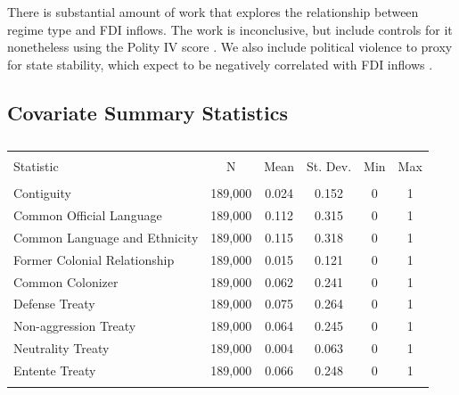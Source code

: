 \documentclass{article}
\begin{document}
There is substantial amount of work that explores the relationship between regime type and FDI inflows. The work is inconclusive, but include controls for it nonetheless using the Polity IV score \citep{polity2012polity}. We also include political violence to proxy for state stability, which expect to be negatively correlated with FDI inflows \citep{marshall2005major}.

\subsection{Covariate Summary Statistics}

\begin{table}[!htbp] \centering 
  \caption{} 
  \label{} 
\begin{tabular}{@{\extracolsep{5pt}}lccccc} 
\\[-1.8ex]\hline 
\hline \\[-1.8ex] 
Statistic & \multicolumn{1}{c}{N} & \multicolumn{1}{c}{Mean} & \multicolumn{1}{c}{St. Dev.} & \multicolumn{1}{c}{Min} & \multicolumn{1}{c}{Max} \\ 
\hline \\[-1.8ex] 
Contiguity & 189,000 & 0.024 & 0.152 & 0 & 1 \\ 
Common Official Language & 189,000 & 0.112 & 0.315 & 0 & 1 \\ 
Common Language and Ethnicity & 189,000 & 0.115 & 0.318 & 0 & 1 \\ 
Former Colonial Relationship & 189,000 & 0.015 & 0.121 & 0 & 1 \\ 
Common Colonizer & 189,000 & 0.062 & 0.241 & 0 & 1 \\ 
Defense Treaty & 189,000 & 0.075 & 0.264 & 0 & 1 \\ 
Non-aggression Treaty & 189,000 & 0.064 & 0.245 & 0 & 1 \\ 
Neutrality Treaty & 189,000 & 0.004 & 0.063 & 0 & 1 \\ 
Entente Treaty & 189,000 & 0.066 & 0.248 & 0 & 1 \\ 
\hline \\[-1.8ex] 
\end{tabular} 
\end{table} 
\end{document}
